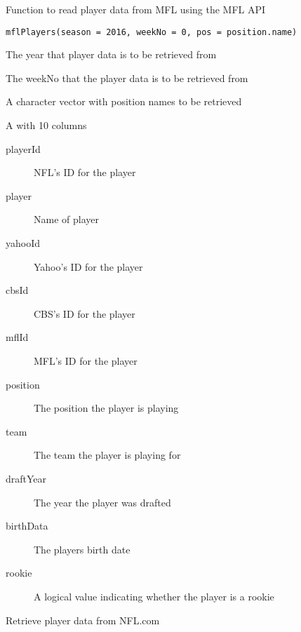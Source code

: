 \documentclass[a4paper]{book}
\begin{document}
%
\begin{Description}\relax
Function to read player data from MFL using the MFL API
\end{Description}
%
\begin{Usage}
\begin{verbatim}
mflPlayers(season = 2016, weekNo = 0, pos = position.name)
\end{verbatim}
\end{Usage}
%
\begin{Arguments}
\begin{ldescription}
\item[\code{season}] The year that player data is to be retrieved from

\item[\code{weekNo}] The weekNo that the player data is to be retrieved from

\item[\code{pos}] A character vector with position names to be retrieved
\end{ldescription}
\end{Arguments}
%
\begin{Value}
A  with 10 columns
\begin{description}

\item[playerId] NFL's ID for the player
\item[player] Name of player
\item[yahooId] Yahoo's ID for the player
\item[cbsId] CBS's ID for the player
\item[mflId] MFL's ID for the player
\item[position] The position the player is playing
\item[team] The team the player is playing for
\item[draftYear] The year the player was drafted
\item[birthData] The players birth date
\item[rookie] A logical value indicating whether the player is a rookie

\end{description}

\end{Value}
%
\begin{Description}\relax
Retrieve player data from NFL.com
\end{Description}
\end{document}

